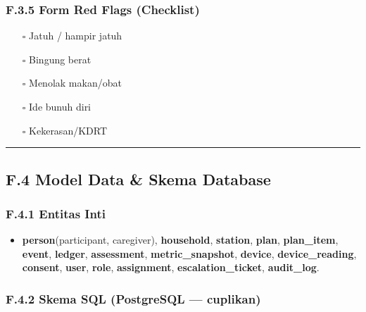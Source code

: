 \documentclass[
  letterpaper,
  DIV=11,
  numbers=noendperiod]{scrartcl}
\providecommand{\tightlist}{%
  \setlength{\itemsep}{0pt}\setlength{\parskip}{0pt}}
\begin{document}
\subsubsection{F.3.5 Form Red Flags
(Checklist)}\label{f.3.5-form-red-flags-checklist}

\begin{itemize}
\tightlist
\item[$\square$]
  Jatuh / hampir jatuh
\item[$\square$]
  Bingung berat
\item[$\square$]
  Menolak makan/obat
\item[$\square$]
  Ide bunuh diri
\item[$\square$]
  Kekerasan/KDRT
\end{itemize}

\begin{center}\rule{0.5\linewidth}{0.5pt}\end{center}

\subsection{F.4 Model Data \& Skema
Database}\label{f.4-model-data-skema-database}

\subsubsection{F.4.1 Entitas Inti}\label{f.4.1-entitas-inti}

\begin{itemize}
\tightlist
\item
  \textbf{person}(participant, caregiver), \textbf{household},
  \textbf{station}, \textbf{plan}, \textbf{plan\_item}, \textbf{event},
  \textbf{ledger}, \textbf{assessment}, \textbf{metric\_snapshot},
  \textbf{device}, \textbf{device\_reading}, \textbf{consent},
  \textbf{user}, \textbf{role}, \textbf{assignment},
  \textbf{escalation\_ticket}, \textbf{audit\_log}.
\end{itemize}

\subsubsection{F.4.2 Skema SQL (PostgreSQL ---
cuplikan)}\label{f.4.2-skema-sql-postgresql-cuplikan}
\end{document}
